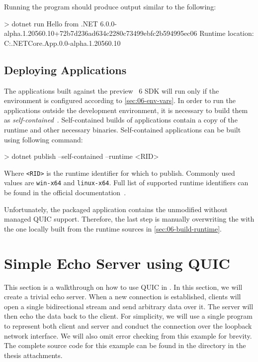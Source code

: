 Running the program should produce output similar to the following:

\noindent\begin{minipage}{\textwidth}
\begin{myVerbatim}
> dotnet run
Hello from .NET 6.0.0-alpha.1.20560.10+72b7d236ad634c2280c73499ebfc2b594995ec06
Runtime location: C:\dotnet\shared\Microsoft.NETCore.App\6.0.0-alpha.1.20560.10
\end{myVerbatim}
\end{minipage}

\subsection{Deploying \dotnet{} Applications}

The applications built against the preview \dotnet{}~6 SDK will run only if the environment is
configured according to \autoref{sec:06-env-vars}. In order to run the applications outside the
development environment, it is necessary to build them as
\textit{self-contained}~\cite{SelfContainedPublishDocs}. Self-contained builds of \dotnet{}
applications contain a copy of the \dotnet{} runtime and other necessary binaries. Self-contained
applications can be built using following command:

\begin{myVerbatim}
> dotnet publish --self-contained --runtime <RID>
\end{myVerbatim}

Where \texttt{<RID>} is the runtime identifier for which to publish. Commonly used values are
\texttt{win-x64} and \texttt{linux-x64}. Full list of supported runtime identifiers can be found in
the official \dotnet{} documentation~\cite{dotnetRIDs}.

Unfortunately, the packaged application contains the unmodified \SystemNetQuicDll{} without managed
QUIC support. Therefore, the last step is manually overwriting the \SystemNetQuicDll{} with the one
locally built from the \dotnet{} runtime sources in \autoref{sec:06-build-runtime}.

\section{Simple Echo Server using QUIC}\label{sec:06-tutorial}

This section is a walkthrough on how to use QUIC in \dotnet{}. In this section, we will create a
trivial echo server. When a new connection is established, clients will open a single bidirectional
stream and send arbitrary data over it. The server will then echo the data back to the client. For
simplicity, we will use a single \dotnet{} program to represent both client and server and conduct
the connection over the loopback network interface. We will also omit error checking from this
example for brevity. The complete source code for this example can be found in the
 directory in the thesis attachments.

